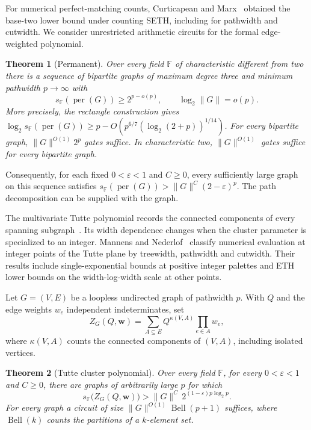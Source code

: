 \documentclass[11pt]{article}
\newtheorem{theorem}{Theorem}[section]
\theoremstyle{definition}
\newcommand{\F}{\mathbb F}
\newcommand{\per}{\operatorname{per}}
\begin{document}
For numerical perfect-matching counts, Curticapean and Marx~\cite[Theorem~1.2 and the paragraph following it]{cm-perfmatch} obtained the base-two lower bound under counting SETH, including for pathwidth and cutwidth. We consider unrestricted arithmetic circuits for the formal edge-weighted polynomial.

\begin{theorem}[Permanent]\label{thm:permanent}
Over every field \(\F\) of characteristic different from two there is a sequence of bipartite graphs of maximum degree three and minimum pathwidth \(p\to\infty\) with
\[
               s_{\F}(\per(G))\ge 2^{p-o(p)},\qquad \log_2 \|G\|=o(p).
\]
More precisely, the rectangle construction gives
\(\log_2 s_{\F}(\per(G))\ge p-O(p^{6/7}(\log_2(2+p))^{1/14})\).
For every bipartite graph, \(\|G\|^{O(1)}2^p\) gates suffice. In characteristic two, \(\|G\|^{O(1)}\) gates suffice for every bipartite graph.
\end{theorem}

Consequently, for each fixed \(0<\varepsilon<1\) and \(C\ge0\), every sufficiently large graph on this sequence satisfies \(s_{\F}(\per(G))>\|G\|^C(2-\varepsilon)^p\). The path decomposition can be supplied with the graph.

The multivariate Tutte polynomial records the connected components of every spanning subgraph~\cite{sokal}. Its width dependence changes when the cluster parameter is specialized to an integer.
Mannens and Nederlof~\cite[Theorem~1.1]{mannens-nederlof-tutte} classify numerical evaluation at integer points of the Tutte plane by treewidth, pathwidth and cutwidth. Their results include single-exponential bounds at positive integer palettes and ETH lower bounds on the width-log-width scale at other points.

Let \(G=(V,E)\) be a loopless undirected graph of pathwidth \(p\). With \(Q\) and the edge weights \(w_e\) independent indeterminates, set
\begin{equation}\label{eq:cluster}
 Z_G(Q,\mathbf w)=\sum_{A\subseteq E}Q^{\kappa(V,A)}\prod_{e\in A}w_e ,
\end{equation}
where \(\kappa(V,A)\) counts the connected components of \((V,A)\), including isolated vertices.

\begin{theorem}[Tutte cluster polynomial]\label{thm:cluster}
Over every field \(\F\), for every \(0<\varepsilon<1\) and \(C\ge0\), there are graphs of arbitrarily large \(p\) for which
\[
             s_{\F}\bigl(Z_G(Q,\mathbf w)\bigr)>\|G\|^C\,2^{(1-\varepsilon)p\log_2 p}.
\]
For every graph a circuit of size \(\|G\|^{O(1)}\operatorname{Bell}(p+1)\) suffices, where \(\operatorname{Bell}(k)\) counts the partitions of a \(k\)-element set.
\end{theorem}
\end{document}
